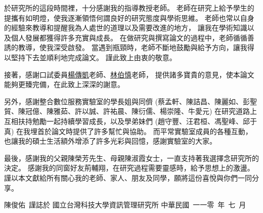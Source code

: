 
\begin{acknowledgement}

    於研究所的這段時間裡，十分感謝我的指導教授\underline{\advisor}老師。
老師在研究上給予學生的提攜有如明燈，使我逐漸領悟何謂良好的研究態度與學術思維。
老師也常以自身的經驗來教導和提醒我為人處世的道理以及需要改進的地方，
讓我在學術知識以及個人發展都獲得許多充實與成長。
在做研究與撰寫論文的過程中，老師循循善誘的教導，使我深受啟發。
當遇到瓶頸時，老師不斷地鼓勵與給予方向，讓我得以堅持下去並順利地完成論文。
謹此致上由衷的敬意。

    接著，感謝口試委員\underline{楊傳凱}老師、\underline{林伯慎}老師，
提供諸多寶貴的意見，使本論文能夠更臻完備，在此致上深深的謝意。

    另外，感謝整合數位服務實驗室的學長姐與同儕
(蔡孟軒、陳詰昌、陳麗如、彭聖貿、陳冠億、陳雅茹、許以誠、許祐晨、陳衍儒、楊崇隆、牛愛元)
在研究道路上互相扶持勉勵一起持續學習成長，以及學弟妹們
(趙守豐、汪君桓、馮聖峰、邱于真)
在我埋首於論文時提供了許多幫忙與協助。
而平常實驗室成員的各種互動，也讓我的碩士生活額外增添了許多光彩與回憶，感謝實驗室的大家。

    最後，感謝我的父親陳榮芳先生、母親陳淑霞女士，一直支持著我選擇念研究所的決定。
感謝我的同窗好友荊輔翔，在研究過程需要靈感時，給予思想上的激盪。
謹以本文獻給所有關心我的老師、家人、朋友及同學，願將這份喜悅與你們一同分享。

\mbox{}
\vfill
\mbox{}\hfill 陳俊佑~謹誌於
\newline
\mbox{}\hfill 國立台灣科技大學資訊管理研究所
\newline
\mbox{}\hfill 中華民國~一一零~年~七~月
\bigbreak

\end{acknowledgement}